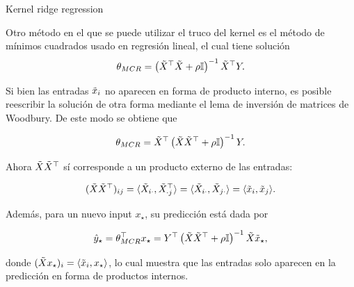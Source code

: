 \documentclass[9pt, handout]{beamer}
\begin{document}
\begin{frame}{Kernel ridge regression}

Otro método en el que se puede utilizar el truco del kernel es el método de mínimos cuadrados usado en regresión lineal, el cual tiene solución
\begin{equation*}
    \theta_{MCR} = \left(\tilde{X}^\top\tilde{X} +\rho {\mathbb I}\right)^{-1} \tilde{X}^\top Y.
\end{equation*}\pause

Si bien las entradas $\tilde{x}_i$ no aparecen en forma de producto interno, es posible reescribir la solución de otra forma mediante el lema de inversión de matrices de Woodbury. De este modo se obtiene que

\begin{equation*}
	\theta_{MCR} = \tilde{X}^\top\left(\tilde{X}\tilde{X}^\top + \rho{\mathbb I}\right)^{-1}Y.
\end{equation*}\pause

Ahora $\tilde{X}\tilde{X}^\top$ sí corresponde a un producto externo de las entradas:

\begin{equation*}
	(\tilde{X}\tilde{X}^\top)_{ij}=\langle\tilde{X}_{i\cdot},\tilde{X}^\top_{\cdot j}\rangle=\langle\tilde{X}_{i\cdot},\tilde{X}_{j\cdot}\rangle = \langle \tilde{x}_i,\tilde{x}_j\rangle.
\end{equation*}\pause

Además, para un nuevo input $x_\star$, su predicción está dada por

\begin{equation*}
	\hat{y}_\star = \theta_{MCR}^\top x_\star = Y^\top \left(\tilde{X}\tilde{X}^\top + \rho{\mathbb I}\right)^{-1}\tilde{X} \tilde{x}_\star,
\end{equation*}

donde $(\tilde{X} x_\star)_i = \langle \tilde{x}_i,x_\star\rangle$, lo cual muestra que las entradas solo aparecen en la predicción en forma de productos internos.

\end{frame}
\end{document}

